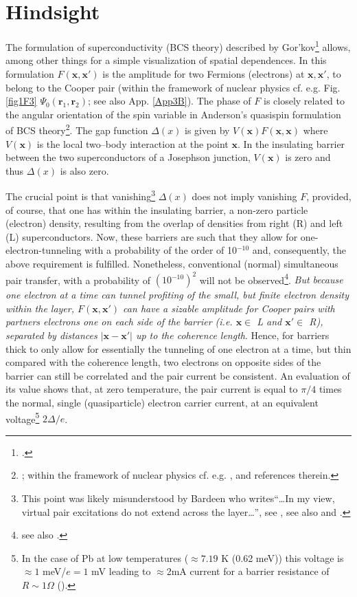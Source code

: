 \section{Hindsight}\label{C3AppE}
The formulation of superconductivity (BCS theory) described by Gor'kov\footnote{\cite{Gorkov:58,Gorkov:59}.} allows, among other things for a simple visualization of spatial dependences. In this formulation $F(\mathbf{x},\mathbf{x}')$ is the amplitude for two Fermions (electrons) at $\mathbf{x},\mathbf{x}'$, to belong to the Cooper pair (within the framework of nuclear physics cf. e.g. Fig. \ref{fig1F3} $\Psi_0(\mathbf{r}_1,\mathbf{r}_2)$; see also App. \ref{App3B}). The phase of $F$ is closely  related to the angular orientation of the spin variable  in Anderson's quasispin formulation of BCS theory\footnote{\cite{Anderson:58b}; within the framework of nuclear physics cf. e.g. \cite{Bohr:88}, \cite{Potel:13b} and references therein.}. The gap function $\Delta(x)$ is given by $V(\mathbf{x})F(\mathbf{x},\mathbf{x})$ where $V(\mathbf{x})$ is the local two--body interaction at the point $\mathbf x$. In the insulating barrier between the two superconductors of a Josephson junction, $V(\mathbf{x})$ is zero and thus $\Delta(x)$ is also zero. 



The crucial point is that vanishing\footnote{This point was likely misunderstood by Bardeen who writes``\dots In my view, virtual pair excitations do not extend across the layer\dots'', see \cite{McDonald:01}, see also \cite{Bardeen:61} and \cite{Bardeen:62}.} $\Delta(x)$ does not imply vanishing $F$, provided, of course, that one has within the insulating barrier, a non-zero particle (electron) density, resulting from the overlap of densities from right (R) and left (L) superconductors. Now, these barriers are such that they allow for one-electron-tunneling with a probability of the order of 10$^{-10}$ and, consequently, the above requirement is fulfilled. Nonetheless, conventional (normal) simultaneous pair transfer, with a probability of $(10^{-10})^2$ will not be observed\footnote{\cite{Pippard:12} see also \cite{McDonald:01}.}. \textit{But because one electron at a time can tunnel profiting of the small, but finite electron density within the layer,   $F(\mathbf{x},\mathbf{x}')$ can have a sizable amplitude for Cooper pairs with partners electrons one on each side of the barrier (i.e. $\mathbf x\in$ L and $\mathbf x'\in$ R), separated by distances $|\mathbf{x}-\mathbf{x}'|$ up to the coherence length}. Hence, for barriers thick to only allow for essentially the tunneling of one electron at a time, but thin compared with the coherence length, two electrons on opposite sides of the barrier can still be correlated and the pair current   be consistent. An evaluation of its 
value shows that, at zero temperature, the pair current is equal to $\pi/4$ times the normal, single (quasiparticle) electron carrier current, at an equivalent voltage\footnote{In the case of Pb at low temperatures ($\approx7.19$ K (0.62 meV)) this voltage is $\approx 1$ meV/$e=1$ mV leading to $\approx$2mA current for a barrier resistance of $R\sim1\Omega$ (\cite{Ambegaokar:63,McDonald:01,Tinkham:96}).} $2\Delta/e$.


